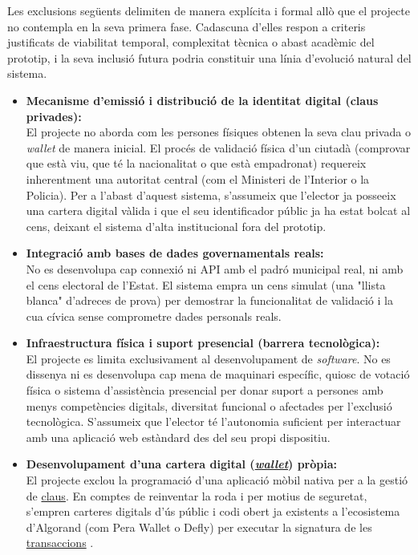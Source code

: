 Les exclusions següents delimiten de manera explícita i formal allò que el projecte no contempla en la seva primera fase. 
Cadascuna d'elles respon a criteris justificats de viabilitat temporal, complexitat tècnica o abast acadèmic del prototip, i la seva inclusió futura podria constituir una línia d'evolució natural del sistema.

\begin{itemize}
    \item \textbf{Mecanisme d'emissió i distribució de la identitat digital (claus privades):} \\
    El projecte no aborda com les persones físiques obtenen la seva clau privada o \textit{wallet} de manera inicial. El procés de validació física d'un ciutadà (comprovar que està viu, que té la nacionalitat o que està empadronat) requereix inherentment una autoritat central (com el Ministeri de l'Interior o la Policia). Per a l'abast d'aquest sistema, s'assumeix que l'elector ja posseeix una cartera digital vàlida i que el seu identificador públic ja ha estat bolcat al cens, deixant el sistema d'alta institucional fora del prototip.
    
    \item \textbf{Integració amb bases de dades governamentals reals:} \\
    No es desenvolupa cap connexió ni API amb el padró municipal real, ni amb el cens electoral de l'Estat. El sistema empra un cens simulat (una "llista blanca" d'adreces de prova) per demostrar la funcionalitat de validació i la cua cívica sense comprometre dades personals reals.

    \item \textbf{Infraestructura física i suport presencial (barrera tecnològica):} \\ El projecte es limita exclusivament al desenvolupament de \textit{software}. No es dissenya ni es desenvolupa cap mena de maquinari específic, quiosc de votació física o sistema d'assistència presencial per donar suport a persones amb menys competències digitals, diversitat funcional o afectades per l'exclusió tecnològica. S'assumeix que l'elector té l'autonomia suficient per interactuar amb una aplicació web estàndard des del seu propi dispositiu.
    
    \item \textbf{Desenvolupament d'una cartera digital (\hyperlink{def:wallet}{\textit{wallet}}) pròpia:} \\
    El projecte exclou la programació d'una aplicació mòbil nativa per a la gestió de \hyperlink{def:claus}{claus}. En comptes de reinventar la roda i per motius de seguretat, s'empren carteres digitals d'ús públic i codi obert ja existents a l'ecosistema d'Algorand (com Pera Wallet o Defly) per executar la signatura de les \hyperlink{def:transaccio}{transaccions} \cite{metamask}.
    

\end{itemize}
